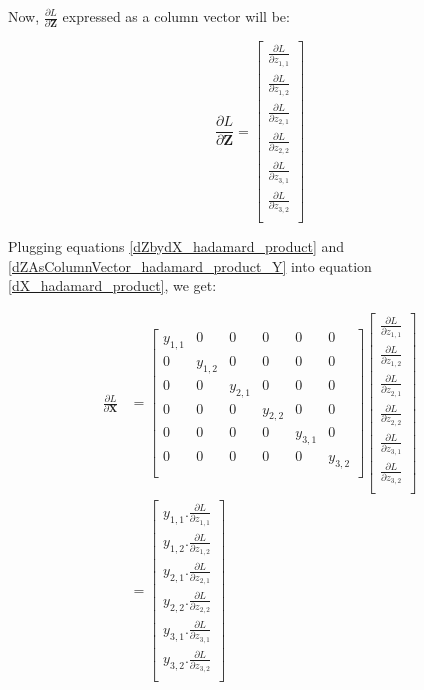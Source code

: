\documentclass{article}
\newcommand{\matr}[1]{\mathbf{#1}} %
\begin{document}
Now, $\frac{\partial L}{\partial \matr{Z}}$ expressed as a column vector will be:

\begin{equation} \label{dZAsColumnVector_hadamard_product_Y}
\frac{\partial L}{\partial \matr{Z}} =
\begin{bmatrix}
\frac{\partial L}{\partial z_{1,1}} \\[0.7em]
\frac{\partial L}{\partial z_{1,2}} \\[0.7em]
\frac{\partial L}{\partial z_{2,1}} \\[0.7em]
\frac{\partial L}{\partial z_{2,2}} \\[0.7em]
\frac{\partial L}{\partial z_{3,1}} \\[0.7em]
\frac{\partial L}{\partial z_{3,2}} \\[0.7em]
\end{bmatrix}
\end{equation}

Plugging equations \ref{dZbydX_hadamard_product} and \ref{dZAsColumnVector_hadamard_product_Y} into equation \ref{dX_hadamard_product}, we get:

\begin{align}
\frac{\partial L}{\partial \matr{X}} &=
\begin{bmatrix}
y_{1,1} & 0 & 0 & 0 & 0 & 0 \\[0.5em]
0 & y_{1,2} & 0 & 0 & 0 & 0 \\[0.5em]
0 & 0 & y_{2,1} & 0 & 0 & 0 \\[0.5em]
0 & 0 & 0 & y_{2,2} & 0 & 0 \\[0.5em]
0 & 0 & 0 & 0 & y_{3,1} & 0 \\[0.5em]
0 & 0 & 0 & 0 & 0 & y_{3,2} \\[0.5em]
\end{bmatrix}
\begin{bmatrix}
\frac{\partial L}{\partial z_{1,1}} \\[0.7em]
\frac{\partial L}{\partial z_{1,2}} \\[0.7em]
\frac{\partial L}{\partial z_{2,1}} \\[0.7em]
\frac{\partial L}{\partial z_{2,2}} \\[0.7em]
\frac{\partial L}{\partial z_{3,1}} \\[0.7em]
\frac{\partial L}{\partial z_{3,2}} \\[0.7em]
\end{bmatrix}
\nonumber \\
&=
\begin{bmatrix}
y_{1,1}.\frac{\partial L}{\partial z_{1,1}} \\[0.7em]
y_{1,2}.\frac{\partial L}{\partial z_{1,2}} \\[0.7em]
y_{2,1}.\frac{\partial L}{\partial z_{2,1}} \\[0.7em]
y_{2,2}.\frac{\partial L}{\partial z_{2,2}} \\[0.7em]
y_{3,1}.\frac{\partial L}{\partial z_{3,1}} \\[0.7em]
y_{3,2}.\frac{\partial L}{\partial z_{3,2}} \\[0.7em]
\end{bmatrix} \label{dXAsColumnVector_hadamard_product}
\end{align}
\end{document}
